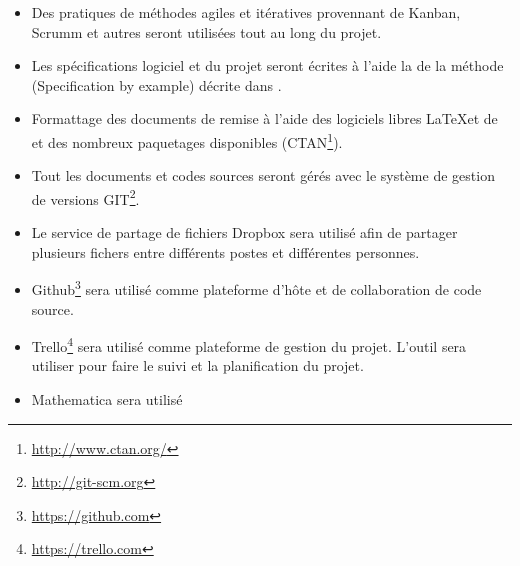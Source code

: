 \documentclass[11pt]{article}
\begin{document}
\begin{itemize}[label={$\bullet$}]
  \item Des pratiques de méthodes agiles et itératives provennant de Kanban, Scrumm et autres seront utilisées tout au long du projet.
  \item Les spécifications logiciel et du projet seront écrites à l'aide la de la méthode (Specification by example) décrite dans \cite{Adzic11}.

  \item Formattage des documents de remise à l'aide des logiciels libres \LaTeX et de \XeLaTeX et des nombreux paquetages disponibles (CTAN\footnote{\url{http://www.ctan.org/}}).

  \item Tout les documents et codes sources seront gérés avec le système de gestion de versions GIT\footnote{\url{http://git-scm.org}}.

  \item Le service de partage de fichiers Dropbox sera utilisé afin de partager plusieurs fichers entre différents postes et différentes personnes.

  \item Github\footnote{\url{https://github.com}} sera utilisé comme plateforme d'hôte et de collaboration de code source.

  \item Trello\footnote{\url{https://trello.com}} sera utilisé comme plateforme de gestion du projet. L'outil sera utiliser pour faire le suivi et la planification du projet.

  \item Mathematica sera utilisé
\end{itemize}


%
%
%


\clearpage

\end{document}
